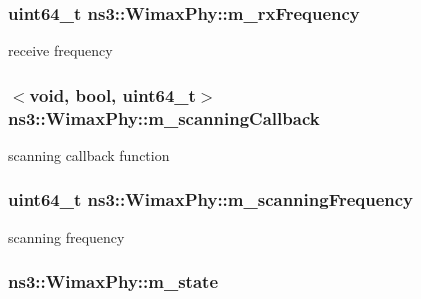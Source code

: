 \subsubsection[{\texorpdfstring{m\+\_\+rx\+Frequency}{m_rxFrequency}}]{\setlength{\rightskip}{0pt plus 5cm}uint64\+\_\+t ns3\+::\+Wimax\+Phy\+::m\+\_\+rx\+Frequency\hspace{0.3cm}{\ttfamily [private]}}\hypertarget{classns3_1_1WimaxPhy_a5c5344a009290fdca59242d4e27dd853}{}\label{classns3_1_1WimaxPhy_a5c5344a009290fdca59242d4e27dd853}


receive frequency 

\subsubsection[{\texorpdfstring{m\+\_\+scanning\+Callback}{m_scanningCallback}}]{$<$void, bool, uint64\+\_\+t$>$ ns3\+::\+Wimax\+Phy\+::m\+\_\+scanning\+Callback\hspace{0.3cm}{\ttfamily [private]}}\hypertarget{classns3_1_1WimaxPhy_abc56220a06166fa9f44df58cc9ed5efb}{}\label{classns3_1_1WimaxPhy_abc56220a06166fa9f44df58cc9ed5efb}


scanning callback function 

\subsubsection[{\texorpdfstring{m\+\_\+scanning\+Frequency}{m_scanningFrequency}}]{\setlength{\rightskip}{0pt plus 5cm}uint64\+\_\+t ns3\+::\+Wimax\+Phy\+::m\+\_\+scanning\+Frequency\hspace{0.3cm}{\ttfamily [private]}}\hypertarget{classns3_1_1WimaxPhy_a88ef4899a77c76ed9510ae15562af215}{}\label{classns3_1_1WimaxPhy_a88ef4899a77c76ed9510ae15562af215}


scanning frequency 

\subsubsection[{\texorpdfstring{m\+\_\+state}{m_state}}]{ ns3\+::\+Wimax\+Phy\+::m\+\_\+state\hspace{0.3cm}{\ttfamily [private]}}\hypertarget{classns3_1_1WimaxPhy_ae196e8ac418d8e75cf0f8a90b875b6c1}{}\label{classns3_1_1WimaxPhy_ae196e8ac418d8e75cf0f8a90b875b6c1}


